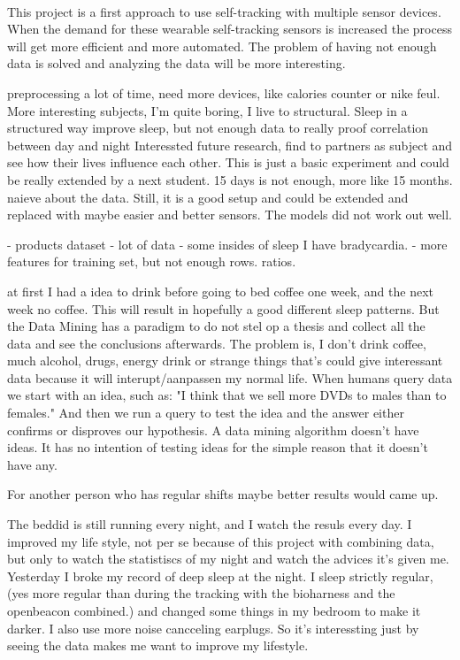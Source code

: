 	\\
	 This project is a first approach to use self-tracking with multiple sensor devices. When the demand for these wearable self-tracking sensors is increased the process will get more efficient and more automated. The problem of having not enough data is solved and analyzing the data will be more interesting. 

	\iffalse
	preprocessing a lot of time, 
	need more devices, like calories counter or nike feul.
	More interesting subjects, I'm quite boring, I live to structural.
	Sleep in a structured way improve sleep, 
		but not enough data to really proof correlation between day and night
	Interessted future research, find to partners as subject and see how their lives influence each other.
	This is just a basic experiment and could be really extended by a next student.
	15 days is not enough, more like 15 months. 
	naieve about the data. 
	Still, it is a good setup and could be extended and replaced with maybe easier and better sensors. 
 The models did not work out well.


	- products dataset
	- lot of data
	-  some insides of sleep
	I have bradycardia. 
	- more features for training set, but not enough rows. ratios.

	at first I had a idea to drink before going to bed coffee one week, and the next week no coffee. This will result in hopefully a good different sleep patterns. But the Data Mining has a paradigm to do not stel op a thesis and collect all the data and see the conclusions afterwards. The problem is, I don't drink coffee, much alcohol, drugs, energy drink or strange things that's could give interessant data because it will interupt/aanpassen my normal life. 
When humans query data we start with an idea, such as: "I think that we sell more DVDs to males than to females." And then we run a query to test the idea and the answer either confirms or disproves our hypothesis. A data mining algorithm doesn't have ideas. It has no intention of testing ideas for the simple reason that it doesn't have any.

	For another person who has regular shifts maybe better results would came up.


	The beddid is still running every night, and I watch the resuls every day. I improved my life style, not per se because of this project with combining data, but only to watch the statistiscs of my night and watch the advices it's given me. Yesterday I broke my record of deep sleep at the night. I sleep strictly regular, (yes more regular than during the tracking with the bioharness and the openbeacon combined.) and changed some things in my bedroom to make it darker. I also use more noise cancceling earplugs. So it's interessting just by seeing the data makes me want to improve my lifestyle. 

